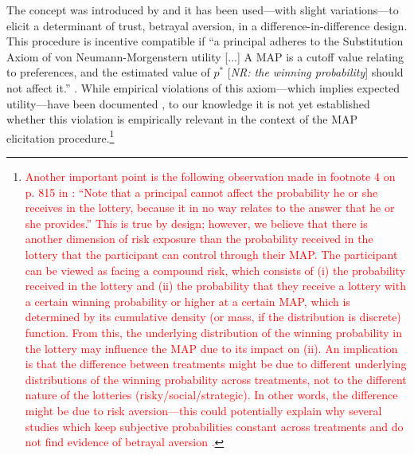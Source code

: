 The concept was introduced by \cite{Bohnet2004} and it has been used—with slight variations—to elicit a determinant of trust, betrayal aversion, in a difference-in-difference design.
This procedure is incentive compatible if ``a principal adheres to the Substitution Axiom of von Neumann-Morgenstern utility [...] A MAP is a cutoff value relating to preferences, and the estimated value of $p^*$ [\textit{NR: the winning probability}] should not affect it.'' \citep[p. 298]{Bohnet2008}.
While empirical violations of this axiom---which implies expected utility---have been documented \cite[see footnote 5 on p. 275 in][for a list of studies finding empirical violations]{Li2020a}, to our knowledge it is not yet established whether this violation is empirically relevant in the context of the MAP elicitation procedure.\footnote{
\textcolor{red}{Another important point is the following observation made in footnote 4 on p. 815 in \cite{Bohnet2010}: ``Note that a principal cannot affect the probability he or she receives in the lottery, because it in no way relates to the answer that he or she provides.''}
\textcolor{red}{This is true by design; however, we believe that there is another dimension of risk exposure than the probability received in the lottery that the participant can control through their MAP.}
\textcolor{red}{The participant can be viewed as facing a compound risk, which consists of (i) the probability received in the lottery and (ii) the probability that they receive a lottery with a certain winning probability or higher at a certain MAP, which is determined by its cumulative density (or mass, if the distribution is discrete) function.}
\textcolor{red}{From this, the underlying distribution of the winning probability in the lottery may influence the MAP due to its impact on (ii).}
\textcolor{red}{An implication is that the difference between treatments might be due to different underlying distributions of the winning probability across treatments, not to the different nature of the lotteries (risky/social/strategic).}
\textcolor{red}{In other words, the difference might be due to risk aversion---this could potentially explain why several studies which keep subjective probabilities constant across treatments and do not find evidence of betrayal aversion \citep{Fetchenhauer2012,Polipciuc2020}.}
}


